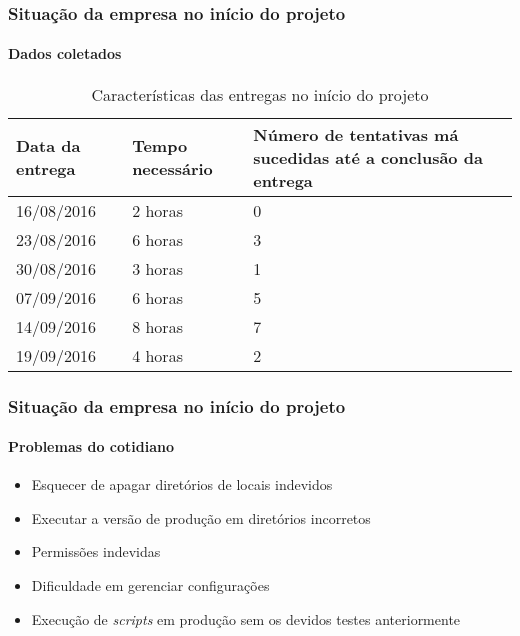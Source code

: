 \documentclass[aspectratio=169]{beamer}
\begin{document}
\begin{frame}
	
	\frametitle{Situação da empresa no início do projeto}
	\framesubtitle{Dados coletados}
	
	\begin{table}[htb]
		\caption{Características das entregas no início do projeto}
		
		\label{tab-deploys}	
		\begin{tabular}{p{3.5cm}|p{3.5cm}|p{5.50cm}}
			\textbf{Data da entrega} & \textbf{Tempo necessário} & \textbf{Número de tentativas má sucedidas até a conclusão da entrega}  \\
			\hline
			16/08/2016 & 2 horas & 0 \\
			\hline
			23/08/2016 & 6 horas & 3 \\
			\hline
			30/08/2016 & 3 horas & 1 \\
			\hline
			07/09/2016 & 6 horas & 5 \\
			\hline
			14/09/2016 & 8 horas & 7 \\
			\hline
			19/09/2016 & 4 horas & 2 \\
		\end{tabular}
	\end{table}
	
\end{frame}


\begin{frame}
	
	\frametitle{Situação da empresa no início do projeto}
	\framesubtitle{Problemas do cotidiano}
	
	\begin{itemize}
		
		\item Esquecer de apagar diretórios de locais indevidos
		
		\item Executar a versão de produção em diretórios incorretos
		
		\item Permissões indevidas
		
		\item Dificuldade em gerenciar configurações
		
		\item Execução de \textit{scripts} em produção sem os devidos testes anteriormente
	\end{itemize}
	
\end{frame}
\end{document}
